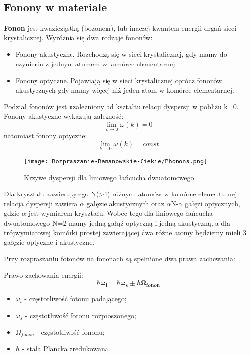 \newpage

\subsection{Fonony w materiale}
\textbf{Fonon} jest kwazicząstką (bozonem), lub inaczej kwantem energii drgań sieci krystalicznej. Wyróżnia się dwa rodzaje fononów:
\begin{itemize}
	\item{Fonony akustyczne. Rozchodzą się w sieci krystalicznej, gdy mamy do czynienia z jednym atomem w komórce elementarnej.}
	\item{Fonony optyczne. Pojawiają się w sieci krystalicznej oprócz fononów akustycznych gdy mamy więcej niż jeden atom w komórce elementarnej.}
\end{itemize}
Podział fononów jest uzależniony od kształtu relacji dyspersji w pobliżu k=0. \\
Fonony akustyczne wykazują zależność:
\begin{equation}
	\lim_{k \to 0} \omega(k) = 0
\end{equation}
natomiast fonony optyczne:
\begin{equation}
\lim_{k \to 0} \omega(k) = const
\end{equation}
\begin{figure}[H]
	\begin{center}
		\texttt{[image: Rozpraszanie-Ramanowskie-Ciekie/Phonons.png]}
		\caption{Krzywe dyspersji dla liniowego łańcucha dwuatomowego.}
	\end{center}
\end{figure}
Dla kryształu zawierającego N(>1) różnych atomów w komórce elementarnej relacja dyspersji zawiera $\alpha$ gałęzie akustycznych oraz $\alpha$N-$\alpha$ gałęzi optycznych, gdzie $\alpha$ jest wymiarem kryształu. Wobec tego dla liniowego łańcucha dwuatomowego N=2 mamy jedną gałąź optyczną i jedną akustyczną, a dla trójwymiarowej komórki prostej zawierającej dwa różne atomy będziemy mieli 3 gałęzie optyczne i akustyczne.

Przy rozpraszaniu fotonów na fononach są spełnione dwa prawa zachowania: 

Prawo zachowania energii:
\begin{equation}
	\hbar \mathbf{\omega_{i}} = \hbar \mathbf{\omega_{s}} \pm \hbar \mathbf{\Omega_{fonon}}
\end{equation}
\begin{itemize}
	\item $\omega_{i}$ - częstotliwość fotonu padającego;
	\item $\omega_{s}$ - częstotliwość fotonu rozproszonego;
	\item $\Omega_{fonon}$ - częstotliwość fononu;
	\item $\hbar$ - stała Plancka zredukowana.
\end{itemize}

